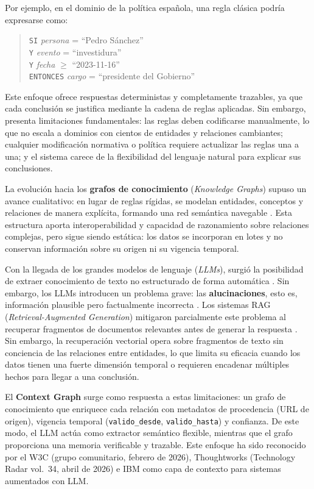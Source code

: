 \documentclass[12pt,a4paper]{article}
\begin{document}
Por ejemplo, en el dominio de la pol\'itica espa\~nola, una regla cl\'asica podr\'ia expresarse como:

\begin{quote}
\texttt{SI} \textit{persona} = ``Pedro S\'anchez'' \\
\texttt{Y} \textit{evento} = ``investidura'' \\
\texttt{Y} \textit{fecha} $\geq$ ``2023-11-16'' \\
\texttt{ENTONCES} \textit{cargo} = ``presidente del Gobierno''
\end{quote}

Este enfoque ofrece respuestas deterministas y completamente trazables, ya que cada conclusi\'on se justifica mediante la cadena de reglas aplicadas. Sin embargo, presenta limitaciones fundamentales: las reglas deben codificarse manualmente, lo que no escala a dominios con cientos de entidades y relaciones cambiantes; cualquier modificaci\'on normativa o pol\'itica requiere actualizar las reglas una a una; y el sistema carece de la flexibilidad del lenguaje natural para explicar sus conclusiones.

La evoluci\'on hacia los \textbf{grafos de conocimiento} (\textit{Knowledge Graphs}) supuso un avance cualitativo: en lugar de reglas r\'igidas, se modelan entidades, conceptos y relaciones de manera expl\'icita, formando una red sem\'antica navegable \cite{hogan2021kg}. Esta estructura aporta interoperabilidad y capacidad de razonamiento sobre relaciones complejas, pero sigue siendo est\'atica: los datos se incorporan en lotes y no conservan informaci\'on sobre su origen ni su vigencia temporal.

Con la llegada de los grandes modelos de lenguaje (\textit{LLMs}), surgi\'o la posibilidad de extraer conocimiento de texto no estructurado de forma autom\'atica \cite{pan2024kg}. Sin embargo, los LLMs introducen un problema grave: las \textbf{alucinaciones}, esto es, informaci\'on plausible pero factualmente incorrecta \cite{ji2023survey}. Los sistemas RAG (\textit{Retrieval-Augmented Generation}) mitigaron parcialmente este problema al recuperar fragmentos de documentos relevantes antes de generar la respuesta \cite{lewis2020rag}. Sin embargo, la recuperaci\'on vectorial opera sobre fragmentos de texto sin conciencia de las relaciones entre entidades, lo que limita su eficacia cuando los datos tienen una fuerte dimensi\'on temporal o requieren encadenar m\'ultiples hechos para llegar a una conclusi\'on.

El \textbf{Context Graph} surge como respuesta a estas limitaciones: un grafo de conocimiento que enriquece cada relaci\'on con metadatos de procedencia (URL de origen), vigencia temporal (\texttt{valido\_desde}, \texttt{valido\_hasta}) y confianza. De este modo, el LLM act\'ua como extractor sem\'antico flexible, mientras que el grafo proporciona una memoria verificable y trazable. Este enfoque ha sido reconocido por el W3C (grupo comunitario, febrero de 2026), Thoughtworks (Technology Radar vol.~34, abril de 2026) e IBM como capa de contexto para sistemas aumentados con LLM.
\end{document}
